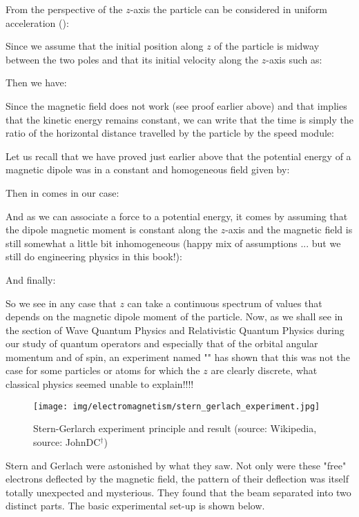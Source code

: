 	From the perspective of the $z$-axis the particle can be considered in uniform acceleration ():
	
	Since we assume that the initial position along $z$ of the particle is midway between the two poles and that its initial velocity along the $z$-axis such as:
	
	Then we have:
	
	Since the magnetic field does not work (see proof earlier above) and that implies that the kinetic energy remains constant, we can write that the time is simply the ratio of the horizontal distance travelled by the particle by the speed module:
	
	Let us recall that we have proved just earlier above that the potential energy of a magnetic dipole was in a constant and homogeneous field given by:
	
	Then in comes in our case:
	
	And as we can associate a force to a potential energy, it comes by assuming that the dipole magnetic moment is constant along the $z$-axis and the magnetic field is still somewhat a little bit inhomogeneous (happy mix of assumptions ... but we still do engineering physics in this book!):
	
	And finally:
	
	So we see in any case that $z$ can take a continuous spectrum of values that depends on the magnetic dipole moment of the particle. Now, as we shall see in the section of Wave Quantum Physics and Relativistic Quantum Physics during our study of quantum operators and especially that of the orbital angular momentum and of spin, an experiment named "" has shown that this was not the case for some particles or atoms for which the $z$ are clearly discrete, what classical physics seemed unable to explain!!!!
	\begin{figure}[H]
		\centering
		\texttt{[image: img/electromagnetism/stern\_gerlach\_experiment.jpg]}
		\caption[Stern-Gerlarch experiment principle and result]{Stern-Gerlarch experiment principle and result (source: Wikipedia, source: JohnDC$^\dagger$)}
	\end{figure}
	Stern and Gerlach were astonished by what they saw. Not only were these "free" electrons deflected by the magnetic field, the pattern of their deflection was itself totally unexpected and mysterious. They found that the beam separated into two distinct parts. The basic experimental set-up is shown below.


